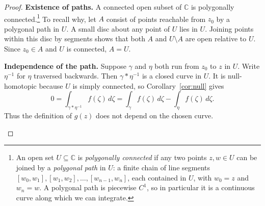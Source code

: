 \documentclass[11pt]{article}
\theoremstyle{plain}
\theoremstyle{definition}
\theoremstyle{remark}
\numberwithin{equation}{section}
\newcommand{\C}{\mathbb{C}}
\begin{document}
\begin{proof}
\textbf{Existence of paths.} A connected open subset of $\C$ is
polygonally connected.\footnote{An open set $U\subseteq\C$ is
\emph{polygonally connected} if any two points $z,w\in U$ can be joined
by a \emph{polygonal path} in $U$: a finite chain of line segments
$[w_0,w_1],[w_1,w_2],\dots,[w_{n-1},w_n]$, each contained in $U$, with
$w_0=z$ and $w_n=w$. A polygonal path is piecewise $C^1$, so in
particular it is a continuous curve along which we can integrate.}
To recall why, let $A$ consist of points reachable
from $z_0$ by a polygonal path in $U$. A small disc about any point of
$U$ lies in $U$. Joining points within this disc by segments shows that
both $A$ and $U\setminus A$ are open relative to $U$. Since $z_0\in A$
and $U$ is connected, $A=U$.

\textbf{Independence of the path.} Suppose $\gamma$ and $\eta$ both
run from $z_0$ to $z$ in $U$. Write $\eta^{-1}$ for $\eta$ traversed
backwards. Then $\gamma*\eta^{-1}$ is a closed curve in $U$.
It is null-homotopic because $U$ is simply connected, so
Corollary~\ref{cor:null} gives
\[
 0=\int_{\gamma*\eta^{-1}}f(\zeta)\,d\zeta
 =\int_\gamma f(\zeta)\,d\zeta-\int_\eta f(\zeta)\,d\zeta.
\]
Thus the definition of $g(z)$ does not depend on the chosen curve.

\begin{center}
\end{center}


\end{proof}
\end{document}

